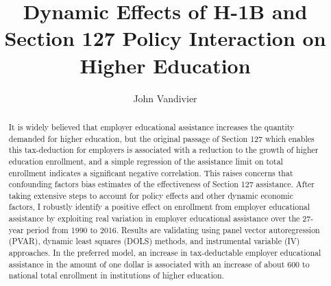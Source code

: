 \documentclass[review]{elsarticle}
\begin{document}
\begin{frontmatter}

\title{
    Dynamic Effects of H-1B and Section 127 Policy Interaction on Higher Education
}

\author[mymainaddress]{John Vandivier} %
\address[mymainaddress]{4400 University Dr, Fairfax, VA 22030}

\begin{abstract}
    It is widely believed that employer educational assistance increases the quantity demanded for higher education,
    but the original passage of Section 127 which enables this tax-deduction for employers is associated with a reduction to the growth of higher education enrollment,
    and a simple regression of the assistance limit on total enrollment indicates a significant negative correlation. %
    This raises concerns that confounding factors bias estimates of the effectiveness of Section 127 assistance.
    After taking extensive steps to account for policy effects and other dynamic economic factors,
    I robustly identify a positive effect on enrollment from employer educational assistance
    by exploiting real variation in employer educational assistance over the 27-year period from 1990 to 2016.
    Results are validating using panel vector autoregression (PVAR),
    dynamic least squares (DOLS) methods,
    and instrumental variable (IV) approaches.
    In the preferred model,
    an increase in tax-deductable employer educational assistance
    in the amount of one dollar is associated with
    an increase of about 600 to national total enrollment in institutions of higher education.


\end{abstract}


\end{frontmatter}
\end{document}
